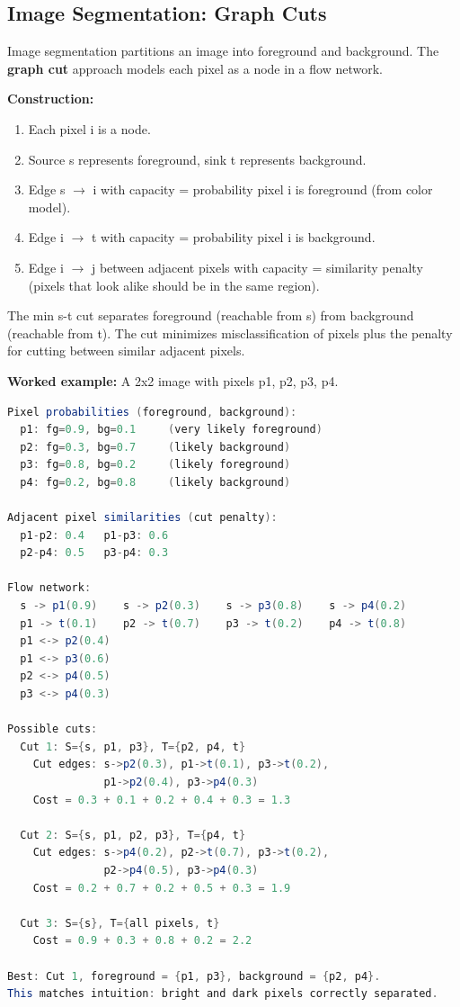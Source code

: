\subsection{Image Segmentation: Graph Cuts}

Image segmentation partitions an image into foreground and background. The \textbf{graph cut} approach models each pixel as a node in a flow network.

\textbf{Construction:}
\begin{enumerate}
\item Each pixel i is a node.
\item Source s represents foreground, sink t represents background.
\item Edge s $\to$ i with capacity = probability pixel i is foreground (from color model).
\item Edge i $\to$ t with capacity = probability pixel i is background.
\item Edge i $\to$ j between adjacent pixels with capacity = similarity penalty (pixels that look alike should be in the same region).
\end{enumerate}
The min s-t cut separates foreground (reachable from s) from background (reachable from t). The cut minimizes misclassification of pixels plus the penalty for cutting between similar adjacent pixels.

\textbf{Worked example:} A 2x2 image with pixels p1, p2, p3, p4.

\begin{lstlisting}[language=Java]
Pixel probabilities (foreground, background):
  p1: fg=0.9, bg=0.1     (very likely foreground)
  p2: fg=0.3, bg=0.7     (likely background)
  p3: fg=0.8, bg=0.2     (likely foreground)
  p4: fg=0.2, bg=0.8     (likely background)

Adjacent pixel similarities (cut penalty):
  p1-p2: 0.4   p1-p3: 0.6
  p2-p4: 0.5   p3-p4: 0.3

Flow network:
  s -> p1(0.9)    s -> p2(0.3)    s -> p3(0.8)    s -> p4(0.2)
  p1 -> t(0.1)    p2 -> t(0.7)    p3 -> t(0.2)    p4 -> t(0.8)
  p1 <-> p2(0.4)
  p1 <-> p3(0.6)
  p2 <-> p4(0.5)
  p3 <-> p4(0.3)

Possible cuts:
  Cut 1: S={s, p1, p3}, T={p2, p4, t}
    Cut edges: s->p2(0.3), p1->t(0.1), p3->t(0.2),
               p1->p2(0.4), p3->p4(0.3)
    Cost = 0.3 + 0.1 + 0.2 + 0.4 + 0.3 = 1.3

  Cut 2: S={s, p1, p2, p3}, T={p4, t}
    Cut edges: s->p4(0.2), p2->t(0.7), p3->t(0.2),
               p2->p4(0.5), p3->p4(0.3)
    Cost = 0.2 + 0.7 + 0.2 + 0.5 + 0.3 = 1.9

  Cut 3: S={s}, T={all pixels, t}
    Cost = 0.9 + 0.3 + 0.8 + 0.2 = 2.2

Best: Cut 1, foreground = {p1, p3}, background = {p2, p4}.
This matches intuition: bright and dark pixels correctly separated.
\end{lstlisting}

